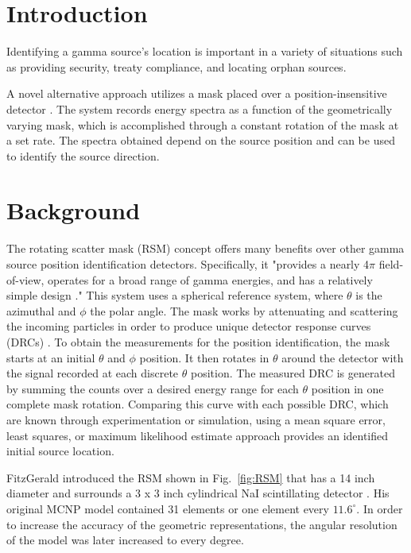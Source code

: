\documentclass[3p,times]{elsarticle}
\begin{document}

\section{Introduction}
\label{intro}
Identifying a gamma source's location is important in a variety of situations such as providing security, treaty compliance, and locating orphan sources.  

A novel alternative approach utilizes a mask placed over a position-insensitive detector \cite{FitzGerald2015}.  
The system records energy spectra as a function of the geometrically varying mask, which is accomplished through a constant rotation of the mask at a set rate. 
The spectra obtained depend on the source position and can be used to identify the source direction.  

\section{Background}
The rotating scatter mask (RSM) concept offers many benefits over other gamma source position identification detectors.  
Specifically, it "provides a nearly 4$\pi$ field-of-view, operates for a broad range of gamma energies, and has a relatively simple design \cite{Logan2017}." 
This system uses a spherical reference system, where $\theta$ is the azimuthal and $\phi$ the polar angle.  
The mask works by attenuating and scattering the incoming particles in order to produce unique detector response curves (DRCs) \cite{Logan2017}.  
To obtain the measurements for the position identification, the mask starts at an initial $\theta$ and $\phi$ position.
It then rotates in $\theta$ around the detector with the signal recorded at each discrete $\theta$ position.  
The measured DRC is generated by summing the counts over a desired energy range for each $\theta$ position in one complete mask rotation.  
Comparing this curve with each possible DRC, which are known through experimentation or simulation, using a mean square error, least squares, or maximum likelihood estimate approach provides an identified initial source location.

FitzGerald introduced the RSM shown in Fig.~\ref{fig:RSM} that has a 14 inch diameter and surrounds a 3 x 3 inch cylindrical NaI scintillating detector \cite{FitzGerald2015}. 
His original MCNP model contained 31 elements or one element every $11.6^\circ$.  
In order to increase the accuracy of the geometric representations,  the angular resolution of the model was later increased to every degree.  
\end{document}
